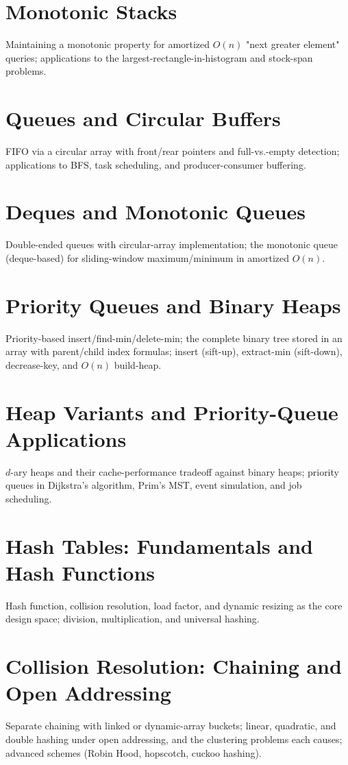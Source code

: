 \chapter{Monotonic Stacks}
Maintaining a monotonic property for amortized $O(n)$ "next greater element" queries; applications to the largest-rectangle-in-histogram and stock-span problems.

\chapter{Queues and Circular Buffers}
FIFO via a circular array with front/rear pointers and full-vs.-empty detection; applications to BFS, task scheduling, and producer-consumer buffering.

\chapter{Deques and Monotonic Queues}
Double-ended queues with circular-array implementation; the monotonic queue (deque-based) for sliding-window maximum/minimum in amortized $O(n)$.

\chapter{Priority Queues and Binary Heaps}
Priority-based insert/find-min/delete-min; the complete binary tree stored in an array with parent/child index formulas; insert (sift-up), extract-min (sift-down), decrease-key, and $O(n)$ build-heap.

\chapter{Heap Variants and Priority-Queue Applications}
$d$-ary heaps and their cache-performance tradeoff against binary heaps; priority queues in Dijkstra's algorithm, Prim's MST, event simulation, and job scheduling.

\chapter{Hash Tables: Fundamentals and Hash Functions}
Hash function, collision resolution, load factor, and dynamic resizing as the core design space; division, multiplication, and universal hashing.

\chapter{Collision Resolution: Chaining and Open Addressing}
Separate chaining with linked or dynamic-array buckets; linear, quadratic, and double hashing under open addressing, and the clustering problems each causes; advanced schemes (Robin Hood, hopscotch, cuckoo hashing).

